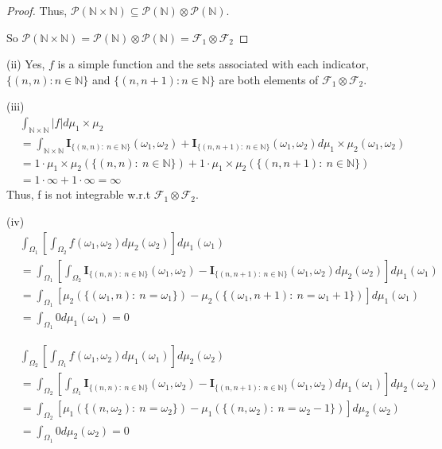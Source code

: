 \documentclass[12pt,letterpaper, onecolumn]{exam}
\newcommand{\nat}{\mathbb{N}}
\newcommand{\power}{\mathcal{P}}
\newcommand{\calF}{\mathcal{F}}
\newcommand{\I}{\mathbf{I}}
\begin{document}
\begin{questions}
\begin{solution}
\begin{proof}
        Thus, $\power(\nat \times \nat) \subseteq \power(\nat) \otimes \power(\nat)$.

        So $\power(\nat \times \nat) = \power(\nat) \otimes \power(\nat) = \calF_1 \otimes \calF_2$
        \end{proof}
        (ii) Yes, $f$ is a simple function and the sets associated with each indicator, $\{(n, n): n \in \nat\}$ and $\{(n, n + 1): n \in \nat\}$ are both elements of $\calF_1 \otimes \calF_2$.

        (iii) 
        \begin{align*}
            & \int_{\nat \times \nat} |f| d \mu_1 \times \mu_2  \\
            & = \int_{\nat \times \nat}  \I_{\{(n, n): \: n\in \nat\}}(\omega_1, \omega_2) + \I_{\{(n, n + 1) : \: n\in \nat\}}(\omega_1, \omega_2) d \mu_1 \times \mu_2 (\omega_1, \omega_2) \\
            & = 1 \cdot \mu_1\times \mu_2(\{(n, n): \: n\in \nat\}) + 1 \cdot \mu_1\times \mu_2(\{(n, n+1): \: n\in \nat\}) \\
            & = 1 \cdot \infty + 1 \cdot \infty = \infty 
        \end{align*}
        Thus, f is not integrable w.r.t $\calF_1 \otimes \calF_2$.

        (iv) 
        \begin{align*}
            & \int_{\Omega_1} \left[\int_{\Omega_2} f(\omega_1, \omega_2) d \mu_2(\omega_2)\right]d\mu_1(\omega_1) \\
            & = \int_{\Omega_1} \left[\int_{\Omega_2} \I_{\{(n, n): \: n\in \nat\}}(\omega_1, \omega_2) - \I_{\{(n, n + 1) : \: n\in \nat\}}(\omega_1, \omega_2) d \mu_2(\omega_2)\right]d\mu_1(\omega_1) \\
            & = \int_{\Omega_1}\left[\mu_2(\{(\omega_1, n): \: n = \omega_1\}) - \mu_2(\{(\omega_1, n + 1): \: n = \omega_1 + 1\})\right]d \mu_1(\omega_1) \\
            & = \int_{\Omega_1} 0 d \mu_1(\omega_1) = 0
        \end{align*}

        \begin{align*}
            & \int_{\Omega_2} \left[\int_{\Omega_1} f(\omega_1, \omega_2) d \mu_1(\omega_1)\right]d\mu_2(\omega_2) \\
            & = \int_{\Omega_2} \left[\int_{\Omega_1} \I_{\{(n, n): \: n\in \nat\}}(\omega_1, \omega_2) - \I_{\{(n, n + 1) : \: n\in \nat\}}(\omega_1, \omega_2) d \mu_1(\omega_1)\right]d\mu_2(\omega_2) \\
            & = \int_{\Omega_2}\left[\mu_1(\{(n, \omega_2): \: n = \omega_2\}) - \mu_1(\{(n, \omega_2): \: n = \omega_2 - 1 \})\right]d \mu_2(\omega_2) \\
            & = \int_{\Omega_1} 0 d \mu_2(\omega_2) = 0
        \end{align*}

        
    \end{solution}


\end{questions}
\end{document}
